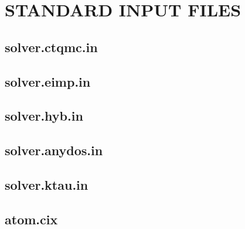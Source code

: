 \chapter{STANDARD INPUT FILES}
\section{solver.ctqmc.in}
\section{solver.eimp.in}
\section{solver.hyb.in}
\section{solver.anydos.in}
\section{solver.ktau.in}
\section{atom.cix}
